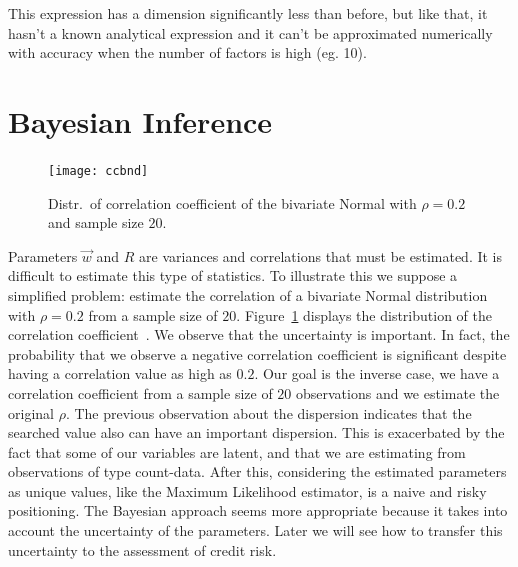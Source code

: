 \documentclass[11pt,fleqn]{book} %
\begin{document}
This expression has a dimension significantly less than before, but like 
that, it hasn't a known analytical expression and it can't be approximated 
numerically with accuracy when the number of factors is high (eg. 10).


\section{Bayesian Inference}

\begin{figure}
	\vspace{-20pt}
	\begin{center}
		\texttt{[image: ccbnd]}
	\end{center}
	\vspace{-10pt}
	\caption{Distr.\ of correlation coefficient of the bivariate Normal with $\rho=0.2$ and sample size $20$.}
	\vspace{-10pt}
	\label{fig:ccbnd}
\end{figure}
Parameters $\vec{w}$ and $R$ are variances and correlations that must be 
estimated. It is difficult to estimate this type of statistics. To illustrate
this we suppose a simplified problem: estimate the correlation of a bivariate 
Normal distribution with $\rho=0.2$ from a sample size of $20$. 
Figure~\ref{fig:ccbnd} displays the distribution of the correlation 
coefficient~\cite[pp. 217--221]{kenney:1951}. We observe that the 
uncertainty is important. In fact, the probability that we observe a negative 
correlation coefficient is significant despite having a correlation value as 
high as $0.2$. Our goal is the inverse case, we have a correlation coefficient 
from a sample size of $20$ observations and we estimate the original $\rho$.
The previous observation about the dispersion indicates that the searched 
value also can have an important dispersion. This is exacerbated by the fact 
that some of our variables are latent, and that we are estimating from 
observations of type count-data. After this, considering the estimated 
parameters as unique values, like the Maximum Likelihood estimator, is a naive 
and risky positioning. The Bayesian approach seems  more appropriate 
\cite{gossl:2005,tarashev:2010} because it takes into account 
the uncertainty of the parameters. Later we will see how to transfer 
this uncertainty to the assessment of credit risk.
\end{document}
